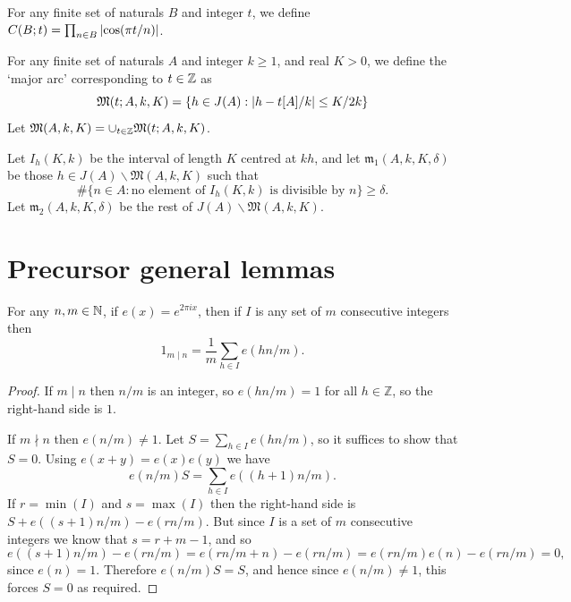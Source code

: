 \begin{definition}
  \label{def:cos_prod}
  \leanok
  For any finite set of naturals $B$ and integer $t$, we define $C(B;t) = \prod_{n\in B}\left\lvert \cos(\pi t/n)\right\rvert$.
\end{definition}

\begin{definition}
  \label{def:major_arc}
  \leanok
  For any finite set of naturals $A$ and integer $k\geq 1$, and real $K>0$, we define the `major arc' corresponding to $t\in\mathbb{Z}$ as
\[\mathfrak{M}(t;A,k,K) = \{ h\in  J(A): \left\lvert h-t[A]/k\right\rvert\leq K/2k\}\]
  Let $\mathfrak{M}(A,k,K) = \cup_{t\in \mathbb{Z}}\mathfrak{M}(t;A,k,K)$.
\end{definition}

\begin{definition}
  \label{def:minor_arcs}
  \leanok
Let $I_h(K,k)$ be the interval of length $K$ centred at $kh$, and let $\mathfrak{m}_1(A,k,K,\delta)$ be those $h\in J(A)\backslash \mathfrak{M}(A,k,K)$ such that
\[\# \{ n\in A : \textrm{no element of }I_h(K,k)\textrm{ is divisible by }n\}\geq \delta.\]
Let $\mathfrak{m}_2(A,k,K,\delta)$ be the rest of $J(A)\backslash\mathfrak{M}(A,k,K)$.
\end{definition}

\section{Precursor general lemmas}

\begin{lemma}\label{lem:orthogonality}
  \leanok
For any $n,m\in\mathbb{N}$, if $e(x) = e^{2\pi ix}$, then if $I$ is any set of $m$ consecutive integers then
\[1_{m\mid n}=\frac{1}{m}\sum_{h\in I}e(h n/m).\]
\end{lemma}
\begin{proof}
  \leanok
If $m\mid n$ then $n/m$ is an integer, so $e(hn/m)=1$ for all $h\in \mathbb{Z}$, so the right-hand side is $1$.

If $m\nmid n$ then $e(n/m)\neq 1$. Let $S=\sum_{h\in I}e(hn/m)$, so it suffices to show that $S=0$. Using $e(x+y)=e(x)e(y)$ we have
\[e(n/m)S = \sum_{h\in I}e((h+1)n/m).\]
If $r=\min(I)$ and $s=\max(I)$ then the right-hand side is $S + e((s+1)n/m)-e(rn/m)$. But since $I$ is a set of $m$ consecutive integers we know that $s=r+m-1$, and so
\[e((s+1)n/m)-e(rn/m) = e(rn/m+n)-e(rn/m)=e(rn/m)e(n)-e(rn/m)=0,\]
since $e(n)=1$. Therefore $e(n/m)S=S$, and hence since $e(n/m)\neq 1$, this forces $S=0$ as required.
\end{proof}

